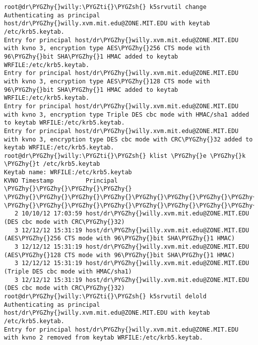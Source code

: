 \documentclass[letterpaper,10pt,english]{sphinxmanual}
\def\PYGZsh{\char`\#}
\def\PYGZhy{\char`\-}
\def\PYGZti{\char`\~}
\begin{document}
\begin{Verbatim}[commandchars=\\\{\}]
root@dr\PYGZhy{}willy:\PYGZti{}\PYGZsh{} k5srvutil change
Authenticating as principal host/dr\PYGZhy{}willy.xvm.mit.edu@ZONE.MIT.EDU with keytab /etc/krb5.keytab.
Entry for principal host/dr\PYGZhy{}willy.xvm.mit.edu@ZONE.MIT.EDU with kvno 3, encryption type AES\PYGZhy{}256 CTS mode with 96\PYGZhy{}bit SHA\PYGZhy{}1 HMAC added to keytab WRFILE:/etc/krb5.keytab.
Entry for principal host/dr\PYGZhy{}willy.xvm.mit.edu@ZONE.MIT.EDU with kvno 3, encryption type AES\PYGZhy{}128 CTS mode with 96\PYGZhy{}bit SHA\PYGZhy{}1 HMAC added to keytab WRFILE:/etc/krb5.keytab.
Entry for principal host/dr\PYGZhy{}willy.xvm.mit.edu@ZONE.MIT.EDU with kvno 3, encryption type Triple DES cbc mode with HMAC/sha1 added to keytab WRFILE:/etc/krb5.keytab.
Entry for principal host/dr\PYGZhy{}willy.xvm.mit.edu@ZONE.MIT.EDU with kvno 3, encryption type DES cbc mode with CRC\PYGZhy{}32 added to keytab WRFILE:/etc/krb5.keytab.
root@dr\PYGZhy{}willy:\PYGZti{}\PYGZsh{} klist \PYGZhy{}e \PYGZhy{}k \PYGZhy{}t /etc/krb5.keytab
Keytab name: WRFILE:/etc/krb5.keytab
KVNO Timestamp         Principal
\PYGZhy{}\PYGZhy{}\PYGZhy{}\PYGZhy{} \PYGZhy{}\PYGZhy{}\PYGZhy{}\PYGZhy{}\PYGZhy{}\PYGZhy{}\PYGZhy{}\PYGZhy{}\PYGZhy{}\PYGZhy{}\PYGZhy{}\PYGZhy{}\PYGZhy{}\PYGZhy{}\PYGZhy{}\PYGZhy{}\PYGZhy{} \PYGZhy{}\PYGZhy{}\PYGZhy{}\PYGZhy{}\PYGZhy{}\PYGZhy{}\PYGZhy{}\PYGZhy{}\PYGZhy{}\PYGZhy{}\PYGZhy{}\PYGZhy{}\PYGZhy{}\PYGZhy{}\PYGZhy{}\PYGZhy{}\PYGZhy{}\PYGZhy{}\PYGZhy{}\PYGZhy{}\PYGZhy{}\PYGZhy{}\PYGZhy{}\PYGZhy{}\PYGZhy{}\PYGZhy{}\PYGZhy{}\PYGZhy{}\PYGZhy{}\PYGZhy{}\PYGZhy{}\PYGZhy{}\PYGZhy{}\PYGZhy{}\PYGZhy{}\PYGZhy{}\PYGZhy{}\PYGZhy{}\PYGZhy{}\PYGZhy{}\PYGZhy{}\PYGZhy{}\PYGZhy{}\PYGZhy{}\PYGZhy{}\PYGZhy{}\PYGZhy{}\PYGZhy{}\PYGZhy{}\PYGZhy{}\PYGZhy{}\PYGZhy{}\PYGZhy{}\PYGZhy{}\PYGZhy{}\PYGZhy{}
   2 10/10/12 17:03:59 host/dr\PYGZhy{}willy.xvm.mit.edu@ZONE.MIT.EDU (DES cbc mode with CRC\PYGZhy{}32)
   3 12/12/12 15:31:19 host/dr\PYGZhy{}willy.xvm.mit.edu@ZONE.MIT.EDU (AES\PYGZhy{}256 CTS mode with 96\PYGZhy{}bit SHA\PYGZhy{}1 HMAC)
   3 12/12/12 15:31:19 host/dr\PYGZhy{}willy.xvm.mit.edu@ZONE.MIT.EDU (AES\PYGZhy{}128 CTS mode with 96\PYGZhy{}bit SHA\PYGZhy{}1 HMAC)
   3 12/12/12 15:31:19 host/dr\PYGZhy{}willy.xvm.mit.edu@ZONE.MIT.EDU (Triple DES cbc mode with HMAC/sha1)
   3 12/12/12 15:31:19 host/dr\PYGZhy{}willy.xvm.mit.edu@ZONE.MIT.EDU (DES cbc mode with CRC\PYGZhy{}32)
root@dr\PYGZhy{}willy:\PYGZti{}\PYGZsh{} k5srvutil delold
Authenticating as principal host/dr\PYGZhy{}willy.xvm.mit.edu@ZONE.MIT.EDU with keytab /etc/krb5.keytab.
Entry for principal host/dr\PYGZhy{}willy.xvm.mit.edu@ZONE.MIT.EDU with kvno 2 removed from keytab WRFILE:/etc/krb5.keytab.
\end{Verbatim}
\end{document}

